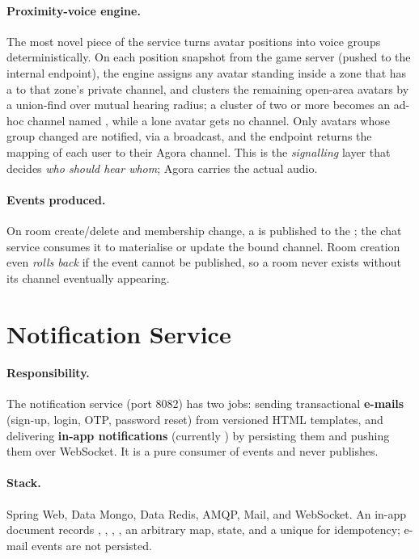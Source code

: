 \paragraph{Proximity-voice engine.} The most novel piece of the service turns
avatar positions into voice groups deterministically. On each position snapshot
from the game server (pushed to the internal  endpoint), the
engine assigns any avatar standing inside a zone that has a  to
that zone's private channel, and clusters the remaining open-area avatars by a
union-find over mutual hearing radius; a cluster of two or more becomes an ad-hoc
channel named , while a lone avatar
gets no channel. Only avatars whose group changed are notified, via a
 broadcast, and the endpoint returns the mapping of
each user to their Agora channel. This is the \emph{signalling} layer that decides
\emph{who should hear whom}; Agora carries the actual audio.

\paragraph{Events produced.} On room create/delete and membership change, a
 is published to the ; the chat service
consumes it to materialise or update the bound  channel. Room creation
even \emph{rolls back} if the event cannot be published, so a room never exists
without its channel eventually appearing.

\section{Notification Service}
\label{sec:be-notif}

\paragraph{Responsibility.} The notification service (port 8082) has two jobs:
sending transactional \textbf{e-mails} (sign-up, login, OTP, password reset) from
versioned HTML templates, and delivering \textbf{in-app notifications} (currently
) by persisting them and pushing them over WebSocket. It is a
pure consumer of events and never publishes.

\paragraph{Stack.} Spring Web, Data Mongo, Data Redis, AMQP, Mail, and WebSocket.
An in-app  document records , ,
, , an arbitrary  map,  state, and a
unique  for idempotency; e-mail events are not persisted.

